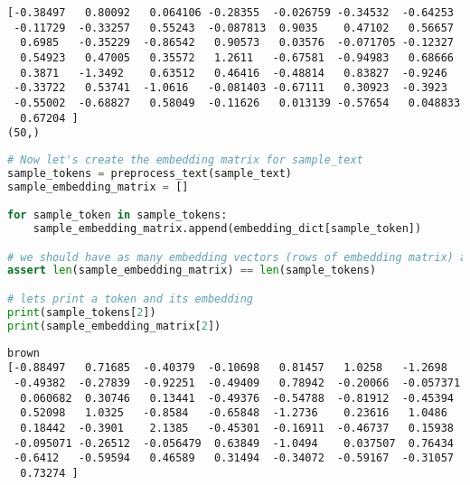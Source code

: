 \begin{lstlisting}
[-0.38497   0.80092   0.064106 -0.28355  -0.026759 -0.34532  -0.64253
 -0.11729  -0.33257   0.55243  -0.087813  0.9035    0.47102   0.56657
  0.6985   -0.35229  -0.86542   0.90573   0.03576  -0.071705 -0.12327
  0.54923   0.47005   0.35572   1.2611   -0.67581  -0.94983   0.68666
  0.3871   -1.3492    0.63512   0.46416  -0.48814   0.83827  -0.9246
 -0.33722   0.53741  -1.0616   -0.081403 -0.67111   0.30923  -0.3923
 -0.55002  -0.68827   0.58049  -0.11626   0.013139 -0.57654   0.048833
  0.67204 ]
(50,)
\end{lstlisting}

\begin{lstlisting}[language=Python]
# Now let's create the embedding matrix for sample_text
sample_tokens = preprocess_text(sample_text)
sample_embedding_matrix = []

for sample_token in sample_tokens:
    sample_embedding_matrix.append(embedding_dict[sample_token])

# we should have as many embedding vectors (rows of embedding matrix) as there are sample tokens
assert len(sample_embedding_matrix) == len(sample_tokens)

# lets print a token and its embedding
print(sample_tokens[2])
print(sample_embedding_matrix[2])
\end{lstlisting}

\begin{lstlisting}
brown
[-0.88497   0.71685  -0.40379  -0.10698   0.81457   1.0258   -1.2698
 -0.49382  -0.27839  -0.92251  -0.49409   0.78942  -0.20066  -0.057371
  0.060682  0.30746   0.13441  -0.49376  -0.54788  -0.81912  -0.45394
  0.52098   1.0325   -0.8584   -0.65848  -1.2736    0.23616   1.0486
  0.18442  -0.3901    2.1385   -0.45301  -0.16911  -0.46737   0.15938
 -0.095071 -0.26512  -0.056479  0.63849  -1.0494    0.037507  0.76434
 -0.6412   -0.59594   0.46589   0.31494  -0.34072  -0.59167  -0.31057
  0.73274 ]
\end{lstlisting}
